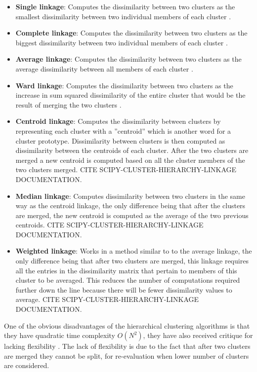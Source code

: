 \begin{itemize}
    \item \textbf{Single linkage}: Computes the dissimilarity between two clusters as the smallest dissimilarity between two individual members of each cluster \cite{dependency_tsc_energy_markets}.
    \item \textbf{Complete linkage}: Computes the dissimilarity between two clusters as the biggest dissimilarity between two individual members of each cluster \cite{financial_tsc_variance_ratio}.
    \item \textbf{Average linkage}: Computes the dissimilarity between two clusters as the average dissimilarity between all members of each cluster \cite{dependency_tsc_energy_markets}.
    \item \textbf{Ward linkage}: Computes the dissimilarity between two clusters as the increase in sum squared dissimilarity of the entire cluster that would be the result of merging the two clusters \cite{copula_ica_tsc}.
    \item \textbf{Centroid linkage}: Computes the dissimilarity between clusters by representing each cluster with a ''centroid'' which is another word for a cluster prototype. Dissimilarity between clusters is then computed as dissimilarity between the centroids of each cluster. After the two clusters are merged a new centroid is computed based on all the cluster members of the two clusters merged. CITE SCIPY-CLUSTER-HIERARCHY-LINKAGE DOCUMENTATION.
    \item \textbf{Median linkage}: Computes dissimilarity between two clusters in the same way as the centroid linkage, the only difference being that after the clusters are merged, the new centroid is computed as the average of the two previous centroids. CITE SCIPY-CLUSTER-HIERARCHY-LINKAGE DOCUMENTATION.
    \item \textbf{Weighted linkage}: Works in a method similar to to the average linkage, the only difference being that after two clusters are merged, this linkage requires all the entries in the dissimilarity matrix that pertain to members of this cluster to be averaged. This reduces the number of computations required further down the line because there will be fewer dissimilarity values to average. CITE SCIPY-CLUSTER-HIERARCHY-LINKAGE DOCUMENTATION.
\end{itemize}

One of the obvious disadvantages of the hierarchical clustering algorithms is that they have quadratic time complexity $O(N^2)$, they have also received critique for lacking flexibility \cite{tsc_rev}. The lack of flexibility is due to the fact that after two clusters are merged they cannot be split, for re-evaluation when lower number of clusters are considered. 

